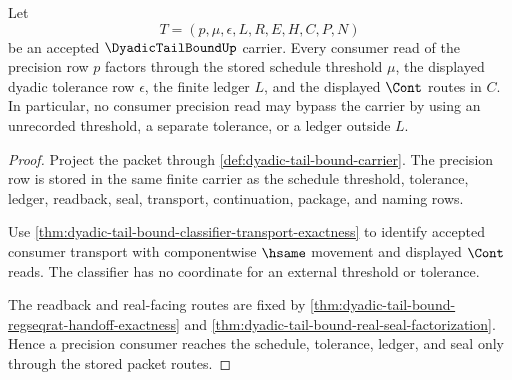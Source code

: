 \begin{theorem}
\label{thm:dyadic-tail-bound-precision-window-restriction}
Let
$$
T=(p,\mu,\epsilon,L,R,E,H,C,P,N)
$$
be an accepted $\DyadicTailBoundUp$ carrier. Every consumer read of the precision row $p$ factors through the stored schedule threshold $\mu$, the displayed dyadic tolerance row $\epsilon$, the finite ledger $L$, and the displayed $\Cont$ routes in $C$. In particular, no consumer precision read may bypass the carrier by using an unrecorded threshold, a separate tolerance, or a ledger outside $L$.
\end{theorem}
\begin{proof}
Project the packet through \autoref{def:dyadic-tail-bound-carrier}. The precision row is stored in the same finite carrier as the schedule threshold, tolerance, ledger, readback, seal, transport, continuation, package, and naming rows.

Use \autoref{thm:dyadic-tail-bound-classifier-transport-exactness} to identify accepted consumer transport with componentwise $\hsame$ movement and displayed $\Cont$ reads. The classifier has no coordinate for an external threshold or tolerance.

The readback and real-facing routes are fixed by \autoref{thm:dyadic-tail-bound-regseqrat-handoff-exactness} and \autoref{thm:dyadic-tail-bound-real-seal-factorization}. Hence a precision consumer reaches the schedule, tolerance, ledger, and seal only through the stored packet routes.
\end{proof}

